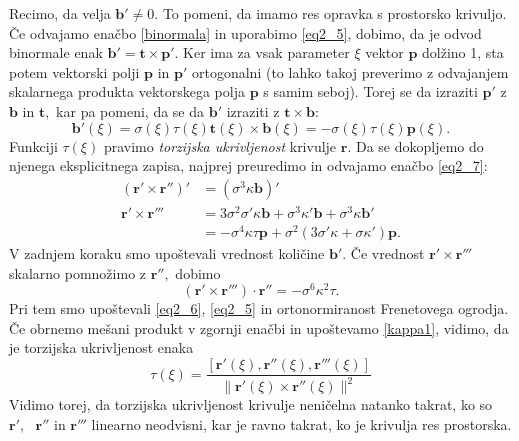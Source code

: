 \documentclass[12pt,a4paper,twoside]{article}
\theoremstyle{definition} %
\theoremstyle{plain} %
\numberwithin{equation}{section}  %
\begin{document}
Recimo, da velja $\mathbf{b'} \neq 0.$ To pomeni, da imamo res opravka s prostorsko krivuljo. Če odvajamo enačbo \eqref{binormala} in uporabimo \eqref{eq2_5}, dobimo, da je odvod binormale enak $\mathbf{b'}=\mathbf{t} \times \mathbf{p'}.$ Ker ima za vsak parameter $\xi$ vektor $\mathbf{p}$ dolžino 1, sta potem vektorski polji $\mathbf{p}$ in $\mathbf{p'}$ ortogonalni (to lahko takoj preverimo z odvajanjem skalarnega produkta vektorskega polja $\mathbf{p}$ s samim seboj). Torej se da izraziti $\mathbf{p'}$ z $\mathbf{b}$ in $\mathbf{t},$ kar pa pomeni, da se da $\mathbf{b'}$ izraziti z $\mathbf{t} \times \mathbf{b}:$
\begin{equation}
	\label{eq2_11}
	\mathbf{b'}(\xi)=\sigma(\xi)\tau(\xi)\mathbf{t}(\xi)\times \mathbf{b}(\xi)=-\sigma(\xi)\tau(\xi)\mathbf{p}(\xi).
\end{equation}
Funkciji $\tau(\xi)$ pravimo \textit{torzijska ukrivljenost} krivulje $\mathbf{r}.$ Da se dokopljemo do njenega eksplicitnega zapisa, najprej preuredimo in odvajamo enačbo \eqref{eq2_7}:
\begin{align*}
	(\mathbf{r'} \times \mathbf{r''})'&=(\sigma^3\kappa \mathbf{b})'\\
	\mathbf{r'} \times \mathbf{r'''} &= 3\sigma^2\sigma'\kappa\mathbf{b}+\sigma^3\kappa'\mathbf{b}+\sigma^3\kappa\mathbf{b'}\\
	&=-\sigma^4\kappa\tau\mathbf{p}+\sigma^2(3\sigma'\kappa+\sigma\kappa')\mathbf{p.}
\end{align*}
V zadnjem koraku smo upoštevali vrednost količine $\mathbf{b'}.$ Če vrednost $\mathbf{r'}\times \mathbf{r'''}$ skalarno pomnožimo z $\mathbf{r''},$ dobimo
\begin{equation}
	(\mathbf{r'}\times\mathbf{r'''})\cdot\mathbf{r''}=-\sigma^6\kappa^2\tau.
\end{equation}
Pri tem smo upoštevali \eqref{eq2_6}, \eqref{eq2_5} in ortonormiranost Frenetovega ogrodja. Če obrnemo mešani produkt v zgornji enačbi in upoštevamo \eqref{kappa1}, vidimo, da je torzijska ukrivljenost enaka
\begin{equation}
	\label{tau1}
	\tau(\xi)=\frac{[\mathbf{r'}(\xi), \mathbf{r''}(\xi), \mathbf{r'''}(\xi)]}{\lVert \mathbf{r'}(\xi)\times \mathbf{r''}(\xi) \rVert^2}
\end{equation}
Vidimo torej, da torzijska ukrivljenost krivulje neničelna natanko takrat, ko so $\mathbf{r'}, \text{ } \mathbf{r''}$ in $\mathbf{r'''}$ linearno neodvisni, kar je ravno takrat, ko je krivulja res prostorska.
\end{document}
